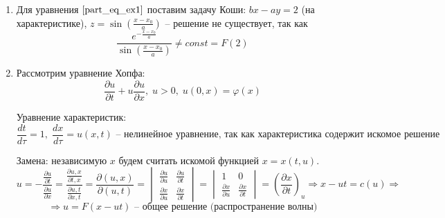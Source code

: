 \documentclass[a4paper, 12pt]{article}
\begin{document}
\begin{enumerate}
        \item

        Для уравнения $\eqref{part_eq_ex1}$ поставим задачу Коши: $bx - ay = 2$ (на характеристике), $z = \sin (\frac{x - x_0}{a})$ -- решение не существует, так как 
        \begin{equation*}
            \frac{e^{-\frac{x - x_0}{a}}}{\sin \left( \frac{x - x_0}{a} \right)} \neq const = F(2)
        \end{equation*}

        \item Рассмотрим уравнение Хопфа:
        \begin{equation*}
            \frac{\partial u}{\partial t} + u \frac{\partial u}{\partial x}, \; u > 0, \; u(0, x) = \varphi(x)
        \end{equation*}

        Уравнение характеристик:
        \begin{equation*}
            \frac{dt}{d \tau} = 1, \; \frac{dx}{d \tau} = u(x, t) \text{ -- нелинейное уравнение, так как характеристика содержит искомое решение}
        \end{equation*}

        Замена: независимую $x$ будем считать искомой функцией $x = x(t, u)$.
        \begin{equation*}
            u = - \frac{\frac{\partial u}{\partial t}}{\frac{\partial u}{\partial x}}  = \frac{\frac{\partial u, x}{\partial t, x}}{\frac{\partial u, t}{\partial x, t}} = \frac{\partial (u, x)}{\partial (u, t)} = 
            \begin{vmatrix}
                \frac{\partial u}{\partial u} & \frac{\partial u}{\partial t} \\
                \frac{\partial x}{\partial u} & \frac{\partial x}{\partial t}
            \end{vmatrix} = 
            \begin{vmatrix}
                1 & 0 \\
                \frac{\partial x}{\partial u} & \frac{\partial x}{\partial t}
            \end{vmatrix} = \left( \frac{\partial x}{\partial t} \right)_{u} \Rightarrow x - ut = c(u) \Rightarrow 
        \end{equation*}
        \begin{equation*}
            \Rightarrow u = F(x - ut) \text{ -- общее решение (распространение волны)}
        \end{equation*}

    \end{enumerate}
\end{document}
